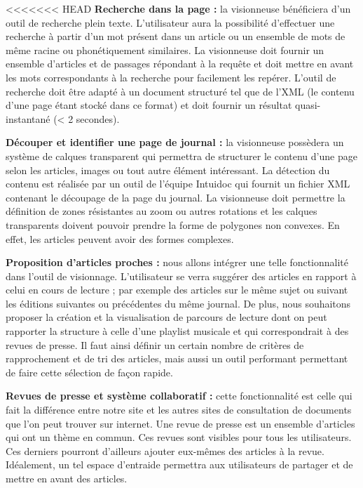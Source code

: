 <<<<<<< HEAD
    \textbf{Recherche dans la page :} la visionneuse bénéficiera d'un outil de recherche plein texte. L'utilisateur aura la possibilité
    d’effectuer une recherche à partir d’un mot présent dans un article ou un ensemble de mots de même racine ou phonétiquement similaires.
    La visionneuse doit fournir un ensemble d’articles et de passages répondant à la requête et doit mettre en avant les mots correspondants à la recherche pour facilement les repérer.
    L’outil de recherche doit être adapté à un document structuré tel que de l’XML (le contenu d’une page étant stocké dans ce format) et doit fournir
    un résultat quasi-instantané (< 2 secondes).


    \textbf{Découper et identifier une page de journal :} la visionneuse possèdera un système de calques transparent qui permettra de structurer le contenu d’une page selon les articles, images ou tout autre élément intéressant. La détection du contenu est réalisée par un outil de l’équipe Intuidoc qui fournit un
    fichier XML contenant le découpage de la page du journal. La visionneuse doit permettre la définition de zones résistantes au zoom ou autres
    rotations et les calques transparents doivent pouvoir prendre la forme de polygones non convexes. En effet, les articles peuvent avoir des formes complexes.


    \textbf{Proposition d’articles proches :} nous allons intégrer une telle fonctionnalité dans l’outil de visionnage. L'utilisateur se verra
    suggérer des articles en rapport à celui en cours de lecture ; par exemple des articles sur le même sujet ou suivant les éditions suivantes ou précédentes
    du même journal. De plus, nous souhaitons proposer la création et la visualisation de parcours de lecture dont on peut rapporter la structure
    à celle d’une playlist musicale et qui correspondrait à des revues de presse. Il faut ainsi définir un certain nombre de critères de rapprochement
    et de tri des articles, mais aussi un outil performant permettant de faire cette sélection de façon rapide.

    \textbf{Revues de presse et système collaboratif :} cette fonctionnalité est celle qui fait la différence entre notre site et les autres sites de consultation de documents que l'on peut trouver sur internet. Une revue de presse est un ensemble d'articles qui ont un thème en commun. Ces revues sont visibles pour tous les utilisateurs. Ces derniers pourront d'ailleurs ajouter eux-mêmes des articles à la revue. Idéalement, un tel espace d’entraide permettra aux utilisateurs de partager et de mettre en avant des articles.
		
